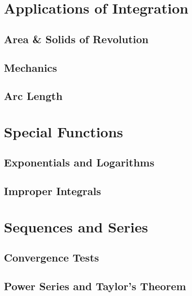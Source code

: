 
\section{Applications of Integration}


\subsection{Area \& Solids of Revolution}

\subsection{Mechanics}

\subsection{Arc Length}



\section{Special Functions}

\subsection{Exponentials and Logarithms}

\subsection{Improper Integrals}



\section{Sequences and Series}

\subsection{Convergence Tests}

\subsection{Power Series and Taylor's Theorem}

